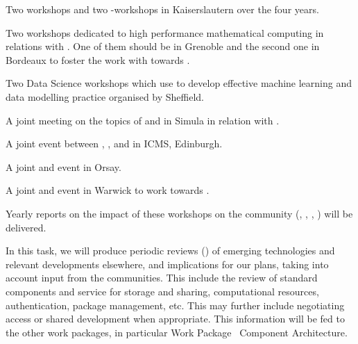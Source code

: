 \begin{workpackage}
\begin{tasklist}
\begin{task}[title=Community Building: Development Workshops, lead=PS,PM=24, partners={UB,UK,SR,SA,USH}, id=devel-workshops, wphases=0-48]
\begin{compactitem}
\item Two \Singular workshops and two \GAP-\Singular workshops in Kaiserslautern
  over the four years.

\item Two workshops dedicated to high performance mathematical
  computing in relations with . One of them should be in
  Grenoble and the second one in Bordeaux to foster the work with
  \Pari towards .

\item Two Data Science workshops which use \TheProject to develop effective machine learning and data modelling practice organised by Sheffield.

\item A joint meeting on the topics of \SMC and \Jupyter in Simula in
  relation with .

\item A joint event between \GAP, \Sage, and \Singular in ICMS,
  Edinburgh.

\item A joint \Jupyter and \Sage event in Orsay.

\item A joint \LMFDB and \Sage event in Warwick to work towards
  .

\end{compactitem}

Yearly reports on the impact of these workshops on the community (, 
, , 
) will be delivered.
\end{task}


\begin{task}[title=Reviewing emerging technologies, id=tech-review, lead=PS, partners={SA,USO,USH,US,UV,UB,SR},PM=11, wphases=0-48]
  In this task, we will produce periodic reviews () of emerging
  technologies and relevant developments elsewhere, and implications
  for our plans, taking into account input from the communities. This
  include the review of standard components and service for storage
  and sharing, computational resources, authentication, package
  management, etc. This may further include negotiating access or
  shared development when appropriate. This information will be fed to
  the other work packages, in particular Work
  Package~ Component Architecture.
\end{task}



\end{tasklist}
\end{workpackage}
